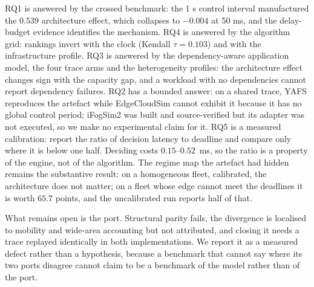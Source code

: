 \documentclass[journal,10pt]{IEEEtran}
\begin{document}
RQ1 is answered by the crossed benchmark: the 1 s control interval manufactured
the $0.539$ architecture effect, which collapses to $-0.004$ at 50 ms, and the
delay-budget evidence identifies the mechanism. RQ4 is answered by the algorithm
grid: rankings invert with the clock (Kendall $\tau=0.103$) and with the
infrastructure profile. RQ3 is answered by the dependency-aware application
model, the four trace arms and the heterogeneity profiles: the architecture
effect changes sign with the capacity gap, and a workload with no dependencies
cannot report dependency failures. RQ2 has a bounded answer: on a shared trace,
YAFS reproduces the artefact while EdgeCloudSim cannot exhibit it because it has
no global control period; iFogSim2 was built and source-verified but its adapter
was not executed, so we make no experimental claim for it. RQ5 is a measured
calibration: report the ratio of decision latency to deadline and compare only
where it is below one half. Deciding costs $0.15$--$0.52$~ms, so the ratio is a
property of the engine, not of the algorithm. The regime map the artefact had
hidden remains the substantive result: on a homogeneous fleet, calibrated, the
architecture does not matter; on a fleet whose edge cannot meet the deadlines it
is worth $65.7$ points, and the uncalibrated run reports half of that.

What remains open is the port. Structural parity fails, the divergence is
localised to mobility and wide-area accounting but not attributed, and closing
it needs a trace replayed identically in both implementations. We report it as a
measured defect rather than a hypothesis, because a benchmark that cannot say
where its two ports disagree cannot claim to be a benchmark of the model rather
than of the port.

\balance


\end{document}
